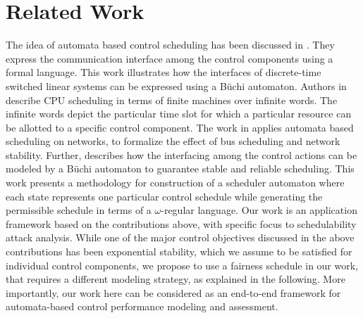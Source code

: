 \section{Related Work} \label{sec2}
\noindent
The idea of automata based control scheduling has been discussed in \cite{WeissA07}. They express
the communication interface among the control components using a formal language. This work illustrates
how the interfaces of discrete-time switched linear systems
can be expressed using a B\"{u}chi automaton. Authors in \cite{AlurW08}  describe CPU scheduling
in terms of finite machines over infinite words. The infinite words depict the particular time 
slot for which a particular resource can be allotted to a specific control component. 
The work in \cite{WeissFAA09} applies automata based scheduling on networks, to formalize
the effect of bus scheduling and network stability. Further, \cite{GhoshMDHD16} describes
how the interfacing among 
the control actions can be modeled by a B\"{u}chi automaton to guarantee stable and reliable
scheduling. This work presents a methodology for construction of a scheduler automaton
where each state represents one particular control schedule while generating the permissible 
schedule in terms of a $\omega$-regular language. Our work is an application framework based 
on the contributions above, with specific focus to schedulability attack analysis. While one 
of the major control objectives discussed in the above contributions has been exponential stability,
which we assume to be satisfied for individual control components, we propose to use a fairness 
schedule in our work, that requires a different modeling strategy, as explained in the following.
More importantly, our work here can be considered as an end-to-end framework for automata-based 
control performance modeling and assessment. \\
  
 
  
